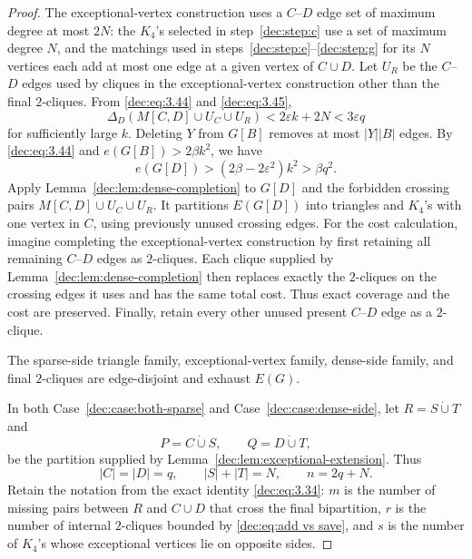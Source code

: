 \documentclass[11pt]{article}
\numberwithin{equation}{section}
\theoremstyle{remark}
\newcommand{\e}{\varepsilon}
\newcommand{\dotcupunion}{\mathbin{\dot\cup}}
\begin{document}
\begin{proof}
The exceptional-vertex construction uses a \(C\)--\(D\) edge set of maximum
degree at most \(2N\): the \(K_4\)'s selected in step~\ref{dec:step:c}
use a set of maximum degree \(N\), and the matchings used in steps~\ref{dec:step:e}--\ref{dec:step:g}
for its \(N\) vertices each add at most one edge at a given vertex of
\(C\cup D\).  Let \(U_R\) be the \(C\)--\(D\) edges used by cliques 
in the exceptional-vertex construction other than the final \(2\)-cliques.
From \eqref{dec:eq:3.44} and \eqref{dec:eq:3.45},
\begin{equation*}
  \Delta_D(M[C,D]\cup U_C\cup U_R)
  <2\e k+2N<3\e q
\end{equation*}
for sufficiently large \(k\). Deleting \(Y\) from \(G[B]\) removes at most \(|Y||B|\) edges.
By \eqref{dec:eq:3.44} and \(e(G[B])>2\beta k^2\), we have
\begin{equation}\label{dec:eq:3.48}
  e(G[D])
  >(2\beta-2\e^2)k^2>\beta q^2.
\end{equation}
Apply Lemma~\ref{dec:lem:dense-completion} to
\(G[D]\) and the forbidden crossing pairs \(M[C,D]\cup U_C\cup U_R\).  It partitions
\(E(G[D])\) into triangles and \(K_4\)'s with one vertex in \(C\), using
previously unused crossing edges. For the cost calculation, imagine completing
the exceptional-vertex construction by first retaining all remaining
\(C\)--\(D\) edges as \(2\)-cliques.  Each clique supplied by
Lemma~\ref{dec:lem:dense-completion} then replaces exactly the \(2\)-cliques on the crossing
edges it uses and has the same total cost.  Thus exact coverage and the cost
are preserved.  Finally, retain every other unused present \(C\)--\(D\) edge as a \(2\)-clique.

The sparse-side triangle family, exceptional-vertex family, dense-side family,
and final \(2\)-cliques are edge-disjoint and exhaust \(E(G)\).

In both Case~\ref{dec:case:both-sparse} and Case~\ref{dec:case:dense-side}, let \(R=S\dotcupunion T\) and
\begin{equation*}
 P=C\dotcupunion S,\qquad Q=D\dotcupunion T,
\end{equation*}
be the partition supplied by Lemma~\ref{dec:lem:exceptional-extension}. Thus
\begin{equation*}
 |C|=|D|=q,\qquad |S|+|T|=N,\qquad n=2q+N.
\end{equation*}
Retain the notation from the exact identity \eqref{dec:eq:3.34}:
\(m\) is the number of missing pairs between \(R\) and
\(C\cup D\) that cross the final bipartition, \(r\) is the number of internal
\(2\)-cliques bounded by \eqref{dec:eq:add vs save}, and \(s\) is the number
of \(K_4\)'s whose exceptional vertices lie on opposite sides.


\end{proof}
\end{document}
